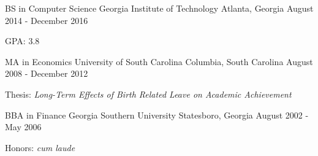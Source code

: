 

\begin{cventries}

  \cventry
    {BS in Computer Science} %
    {Georgia Institute of Technology} %
    {Atlanta, Georgia} %
    {August 2014 - December 2016} %
    {
      \begin{cvitems} %
        \item {GPA: 3.8}
      \end{cvitems}
    }
    
    \cventry
    {MA in Economics} %
    {University of South Carolina} %
    {Columbia, South Carolina} %
    {August 2008 - December 2012} %
    {
      \begin{cvitems} %
        \item {Thesis: \textit{Long-Term Effects of Birth Related Leave on Academic Achievement}}
      \end{cvitems}
    }
    
    \cventry
    {BBA in Finance} %
    {Georgia Southern University} %
    {Statesboro, Georgia} %
    {August 2002 - May 2006} %
    {
      \begin{cvitems} %
        \item {Honors: \textit{cum laude}}
      \end{cvitems}
    }

\end{cventries}
